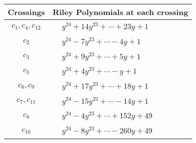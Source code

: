 \documentclass[1p]{elsarticle_modified}
\theoremstyle{definition}
\begin{document}
\begin{tabular}{m{50pt}|m{274pt}}
Crossings & \hspace{64pt}Riley Polynomials at each crossing \\
\hline $$\begin{aligned}c_{1},c_{4},c_{12}\end{aligned}$$&$\begin{aligned}
&y^{24}+14 y^{23}+\cdots+23 y+1
\end{aligned}$\\
\hline $$\begin{aligned}c_{2}\end{aligned}$$&$\begin{aligned}
&y^{24}-7 y^{23}+\cdots-4 y+1
\end{aligned}$\\
\hline $$\begin{aligned}c_{3}\end{aligned}$$&$\begin{aligned}
&y^{24}+9 y^{23}+\cdots+5 y+1
\end{aligned}$\\
\hline $$\begin{aligned}c_{5}\end{aligned}$$&$\begin{aligned}
&y^{24}+4 y^{23}+\cdots- y+1
\end{aligned}$\\
\hline $$\begin{aligned}c_{6},c_{9}\end{aligned}$$&$\begin{aligned}
&y^{24}+17 y^{23}+\cdots+18 y+1
\end{aligned}$\\
\hline $$\begin{aligned}c_{7},c_{11}\end{aligned}$$&$\begin{aligned}
&y^{24}-15 y^{23}+\cdots-14 y+1
\end{aligned}$\\
\hline $$\begin{aligned}c_{8}\end{aligned}$$&$\begin{aligned}
&y^{24}-4 y^{23}+\cdots+152 y+49
\end{aligned}$\\
\hline $$\begin{aligned}c_{10}\end{aligned}$$&$\begin{aligned}
&y^{24}-8 y^{23}+\cdots-260 y+49
\end{aligned}$\\
\hline
\end{tabular}\\~\\
\end{document}
